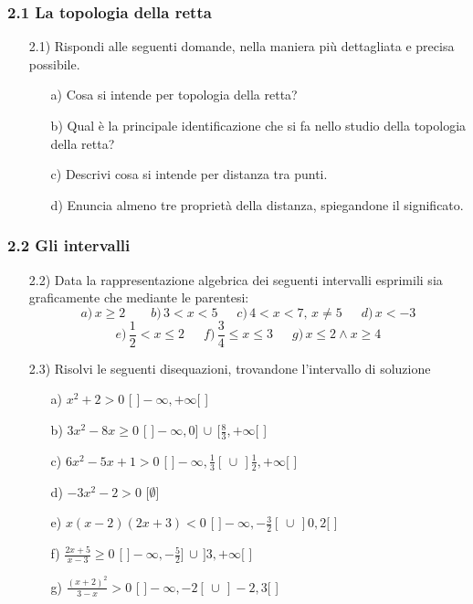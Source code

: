   \subsubsection*{2.1 La topologia della retta}
  \begin{itemize}
  \item[2.1)] Rispondi alle seguenti domande, 
nella maniera più dettagliata e precisa possibile.
  \begin{itemize}
  \item[a)] Cosa si intende per 
topologia della retta?
  \item [b)] Qual è la 
principale identificazione che si fa nello studio della topologia della retta?
  \item[c)] Descrivi cosa si 
intende per distanza tra punti.
  \item[d)] Enuncia almeno tre 
proprietà della distanza, spiegandone il significato.
  \end{itemize}   
  \end{itemize}
  \subsubsection*{2.2 Gli intervalli}
  \begin{itemize}
  \item[2.2)] Data la rappresentazione algebrica 
dei seguenti intervalli esprimili sia graficamente che mediante le parentesi:
$$a)\, x\geq2\,\,\, \,\,\, \,\,\, \,\,\, b)\, 3<x<5  \,\,\,\,\,\, \,\,\,   
c)\, 4<x<7,\, x\neq5  \,\,\,  \,\,\, \,\,\,  d)\, x<-3 $$
$$ e) \, \frac{1}{2}<x\leq2 \,\,\, \,\,\,  \,\,\,  f)\, \frac{3}{4}\leq 
x\leq3\,\,\, \,\,\, \,\,\,  g)\, x\leq2\land x\geq4$$

  \item[2.3)] Risolvi le seguenti disequazioni, 
trovandone l'intervallo di soluzione
  \begin{itemize}
  \item[a)] $x^2+2>0$  
   \hfill  [ $]-\infty,+\infty[$ ]
  \item[b)] $3x^2-8x\geq0$   
   \hfill   [ $]-\infty,0]\,\cup\,[\frac{8}{3},+\infty[$ 
 ]
  \item[c)] $6x^2-5x+1>0$  
  \hfill   [ $]-\infty, 
\frac{1}{3}[\,\cup\,]\frac{1}{2}, +\infty[$  ]
  \item[d)] $-3x^2-2>0$  
  \hfill   [$\emptyset$]
  \item[e)] $x(x-2)(2x+3)<0$   
   \hfill   [ $]-\infty, -\frac{3}{2}[\,\cup\, ]0, 2[$ ]
  \item[f)] 
$\frac{2x+5}{x-3}\geq0$   \hfill   [ $ 
]-\infty,-\frac{5}{2}]\,\cup\,]3,+\infty[$ ]
  \item[g)] 
$\frac{(x+2)^2}{3-x}>0$  \hfill   [ $ ]-\infty, 
-2[\,\cup\,]-2, 3[$ ]
  \end{itemize}
  \end{itemize}   
